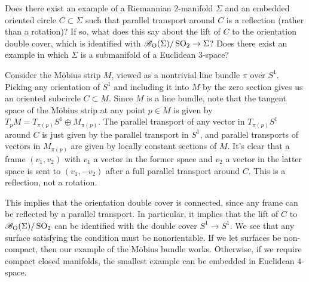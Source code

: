\documentclass{../../templates/lkx_pset}
\begin{document}
\begin{problem}{3}
  Does there exist an example of a Riemannian $2$-manifold $\Sigma$ and an embedded oriented circle $C\subset \Sigma$ such that parallel transport around $C$ is a reflection (rather than a rotation)?
  If so, what does this say about the lift of $C$ to the orientation double cover, which is identified with $\mathscr{B}_{\operatorname{O}}(\Sigma)/\operatorname{SO}_2 \to \Sigma$? Does there exist an example in which $\Sigma$ is a submanifold of a Euclidean $3$-space?
\end{problem}

\begin{solution}
  Consider the M\"obius strip $M$, viewed as a nontrivial line bundle $\pi$ over $S^1$. Picking any orientation of $S^1$ and including it into $M$ by the zero section gives us an oriented subcircle $C\subset M$. Since $M$ is a line bundle, note that the tangent space of  the M\"obius strip at any point $p\in M$ is given by $T_p M = T_{\pi(p)} S^1\oplus M_{\pi(p)}$. The parallel transport of any vector in $T_{\pi(p)}S^1$ around $C$ is just given by the parallel transport in $S^1$, and parallel transports of vectors in $M_{\pi(p)}$ are given by locally constant sections of $M$. It's clear that a frame $(v_1,v_2)$ with $v_1$ a vector in the former space and $v_2$ a vector in the latter space is sent to $(v_1, -v_2)$ after a full parallel transport around $C$. This is a reflection, not a rotation.

  This implies that the orientation double cover is connected, since any frame can be reflected by a parallel transport. In particular, it implies that the lift of $C$ to $\mathscr{B}_{\operatorname{O}}(\Sigma)/\operatorname{SO}_2$ can be identified with the double cover $S^1\to S^1$. We see that any surface satisfying the condition must be nonorientable. If we let surfaces be non-compact, then our example of the M\"obius bundle works. Otherwise, if we require compact closed manifolds, the smallest example can be embedded in Euclidean $4$-space.
\end{solution}
\end{document}
